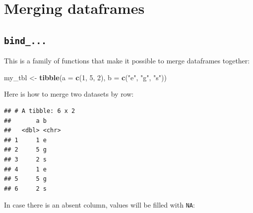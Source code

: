 \documentclass[
]{book}
\newenvironment{Shaded}{\begin{snugshade}}{\end{snugshade}}
\newcommand{\DataTypeTok}[1]{\textcolor[rgb]{0.13,0.29,0.53}{#1}}
\newcommand{\DecValTok}[1]{\textcolor[rgb]{0.00,0.00,0.81}{#1}}
\newcommand{\KeywordTok}[1]{\textcolor[rgb]{0.13,0.29,0.53}{\textbf{#1}}}
\newcommand{\NormalTok}[1]{#1}
\newcommand{\OperatorTok}[1]{\textcolor[rgb]{0.81,0.36,0.00}{\textbf{#1}}}
\newcommand{\StringTok}[1]{\textcolor[rgb]{0.31,0.60,0.02}{#1}}
\begin{document}
\hypertarget{merging-dataframes}{%
\section{Merging dataframes}\label{merging-dataframes}}

\hypertarget{bind_...}{%
\subsection{\texorpdfstring{\texttt{bind\_...}}{bind\_...}}\label{bind_...}}

This is a family of functions that make it possible to merge dataframes together:

\begin{Shaded}
\begin{Highlighting}[]
\NormalTok{my_tbl <-}\StringTok{ }\KeywordTok{tibble}\NormalTok{(}\DataTypeTok{a  =} \KeywordTok{c}\NormalTok{(}\DecValTok{1}\NormalTok{, }\DecValTok{5}\NormalTok{, }\DecValTok{2}\NormalTok{), }
                 \DataTypeTok{b =} \KeywordTok{c}\NormalTok{(}\StringTok{"e"}\NormalTok{, }\StringTok{"g"}\NormalTok{, }\StringTok{"s"}\NormalTok{))}
\end{Highlighting}
\end{Shaded}

Here is how to merge two datasets by row:

\begin{Shaded}
\end{Shaded}

\begin{verbatim}
## # A tibble: 6 x 2
##       a b    
##   <dbl> <chr>
## 1     1 e    
## 2     5 g    
## 3     2 s    
## 4     1 e    
## 5     5 g    
## 6     2 s
\end{verbatim}

In case there is an absent column, values will be filled with \texttt{NA}:

\begin{Shaded}
\end{Shaded}
\end{document}
